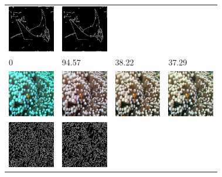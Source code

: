 \documentclass[conference,reqno]{IEEEtran}
\begin{document}
\begin{figure}
\begin{tabular}{p{1.7cm} p{1.7cm} p{1.7cm} p{1.5cm}}
   \includegraphics[width=0.8in]{n01496331_22079_u0edges}  &
   \includegraphics[width=0.8in]{n01496331_22079_u1edges}  \\
   0 & \small{94.57} & \small{38.22} & \small{37.29} \\

   \includegraphics[width=0.8in]{n02607072_4739_original} &
   \includegraphics[width=0.8in]{n02607072_4739_cimg} &
   \includegraphics[width=0.8in]{n02607072_4739_u0img} &
   \includegraphics[width=0.8in]{n02607072_4739_u1img} \\ [-1ex]
   \includegraphics[width=0.8in]{n02607072_4739_oedges} &
   \includegraphics[width=0.8in]{n02607072_4739_cedges} &

\end{tabular}
\end{figure}
\end{document}
